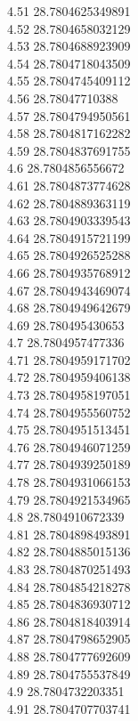 {4.51	28.7804625349891\\
4.52	28.7804658032129\\
4.53	28.7804688923909\\
4.54	28.7804718043509\\
4.55	28.7804745409112\\
4.56	28.78047710388\\
4.57	28.7804794950561\\
4.58	28.7804817162282\\
4.59	28.7804837691755\\
4.6	28.7804856556672\\
4.61	28.7804873774628\\
4.62	28.7804889363119\\
4.63	28.7804903339543\\
4.64	28.7804915721199\\
4.65	28.7804926525288\\
4.66	28.7804935768912\\
4.67	28.7804943469074\\
4.68	28.7804949642679\\
4.69	28.780495430653\\
4.7	28.7804957477336\\
4.71	28.7804959171702\\
4.72	28.7804959406138\\
4.73	28.7804958197051\\
4.74	28.7804955560752\\
4.75	28.7804951513451\\
4.76	28.7804946071259\\
4.77	28.7804939250189\\
4.78	28.7804931066153\\
4.79	28.7804921534965\\
4.8	28.7804910672339\\
4.81	28.7804898493891\\
4.82	28.7804885015136\\
4.83	28.7804870251493\\
4.84	28.7804854218278\\
4.85	28.7804836930712\\
4.86	28.7804818403914\\
4.87	28.7804798652905\\
4.88	28.7804777692609\\
4.89	28.7804755537849\\
4.9	28.7804732203351\\
4.91	28.7804707703741\\
}
